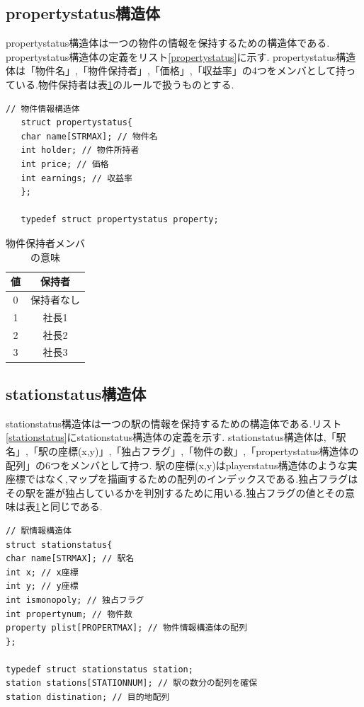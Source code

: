 \documentclass[a4j]{jarticle}
\begin{document}
    \subsection{propertystatus構造体}
    propertystatus構造体は一つの物件の情報を保持するための構造体である. propertystatus構造体の定義をリスト\ref{propertystatus}に示す.
    propertystatus構造体は「物件名」,「物件保持者」,「価格」,「収益率」の4つをメンバとして持っている.物件保持者は表\ref{whohold}のルールで扱うものとする.
   \begin{lstlisting}[basicstyle=\ttfamily\footnotesize, frame=single,label=propertystatus,caption=propertystatus構造体の定義]
   // 物件情報構造体
   struct propertystatus{
   char name[STRMAX]; // 物件名
   int holder; // 物件所持者
   int price; // 価格
   int earnings; // 収益率
   };
   
   typedef struct propertystatus property;
   \end{lstlisting}
   
   \begin{table}[H]
     \caption{物件保持者メンバの意味}
   \label{whohold}
   \begin{center}
       \begin{tabular}{c|c}\hline
       値 & 保持者 \\ \hline \hline
         0 & 保持者なし \\
         1 & 社長1 \\
         2 & 社長2 \\
         3 & 社長3 \\ \hline
       \end{tabular}
   \end{center}
   \end{table}

    \subsection{stationstatus構造体}
stationstatus構造体は一つの駅の情報を保持するための構造体である.リスト\ref{stationstatus}にstationstatus構造体の定義を示す.
stationstatus構造体は,「駅名」,「駅の座標(x,y)」,「独占フラグ」,「物件の数」,「propertystatus構造体の配列」の6つをメンバとして持つ.
駅の座標(x,y)はplayerstatus構造体のような実座標ではなく,マップを描画するための配列のインデックスである.独占フラグは
その駅を誰が独占しているかを判別するために用いる.独占フラグの値とその意味は表\ref{whohold}と同じである.
\begin{lstlisting}[basicstyle=\ttfamily\footnotesize, frame=single,label=stationstatus,caption=stationstatus構造体の定義と初期化]
// 駅情報構造体
struct stationstatus{
char name[STRMAX]; // 駅名
int x; // x座標
int y; // y座標
int ismonopoly; // 独占フラグ
int propertynum; // 物件数
property plist[PROPERTMAX]; // 物件情報構造体の配列
};

typedef struct stationstatus station;
station stations[STATIONNUM]; // 駅の数分の配列を確保
station distination; // 目的地配列
\end{lstlisting}
\end{document}

